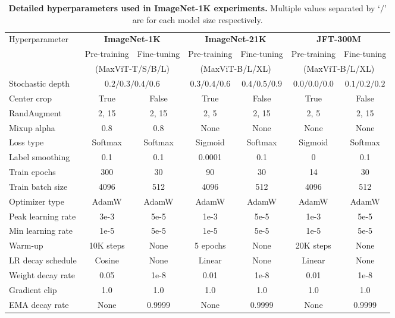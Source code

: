 \documentclass[runningheads]{llncs}
\begin{document}
\begin{table}[!ht]
\scriptsize
\centering
\setlength{\tabcolsep}{2pt}
\renewcommand{\arraystretch}{1.1}
\caption{\textbf{Detailed hyperparameters used in ImageNet-1K experiments.} Multiple values separated by `$/$' are for each model size respectively.}
\label{tab:i1k-experimental-settings}
\begin{tabular}{l|cc|cc|cc}
\multirow{3}{*}{Hyperparameter}  & \multicolumn{2}{c|}{\textbf{ImageNet-1K}} & \multicolumn{2}{c|}{\textbf{ImageNet-21K}} &
\multicolumn{2}{c}{\textbf{JFT-300M}} \\
& Pre-training & Fine-tuning & Pre-training & Fine-tuning & Pre-training & Fine-tuning \\
& \multicolumn{2}{c|}{(MaxViT-T/S/B/L)}
& \multicolumn{2}{c|}{(MaxViT-B/L/XL)}
& \multicolumn{2}{c}{(MaxViT-B/L/XL)} \\
\toprule
Stochastic depth & \multicolumn{2}{c|}{$0.2/0.3/0.4/0.6$} & \multicolumn{1}{c}{$0.3/0.4/0.6$} &
\multicolumn{1}{c|}{$0.4/0.5/0.9$} &
\multicolumn{1}{c}{$0.0/0.0/0.0$} & \multicolumn{1}{c}{$0.1/0.2/0.2$} \\
Center crop  & True & False & True & False & True & False \\
RandAugment & 2, 15 & 2, 15 & 2, 5 & 2, 15 & 2, 5 & 2, 15 \\
Mixup alpha & 0.8 & 0.8 & None & None & None & None  \\
Loss type & Softmax & Softmax & Sigmoid & Softmax & Sigmoid & Softmax \\
Label smoothing & 0.1 & 0.1 & 0.0001 & 0.1 & 0 & 0.1 \\
Train epochs & 300 & 30 & 90 & 30 & 14 & 30 \\
Train batch size & 4096 & 512 & 4096 & 512 & 4096 & 512 \\
Optimizer type & AdamW & AdamW & AdamW & AdamW & AdamW & AdamW \\
Peak learning rate & 3e-3 & 5e-5 & 1e-3 & 5e-5 & 1e-3 & 5e-5 \\
Min learning rate & 1e-5 & 5e-5 & 1e-5 & 5e-5 & 1e-5 & 5e-5 \\
Warm-up & 10K steps & None & 5 epochs & None & 20K steps & None \\
LR decay schedule & Cosine & None & Linear & None & Linear & None \\
Weight decay rate & 0.05 & 1e-8 & 0.01 & 1e-8 & 0.01 & 1e-8 \\
Gradient clip & 1.0 & 1.0 & 1.0 & 1.0 & 1.0 & 1.0 \\
EMA decay rate & None & 0.9999 & None & 0.9999 & None & 0.9999 \\
\end{tabular}
\end{table}
\end{document}
